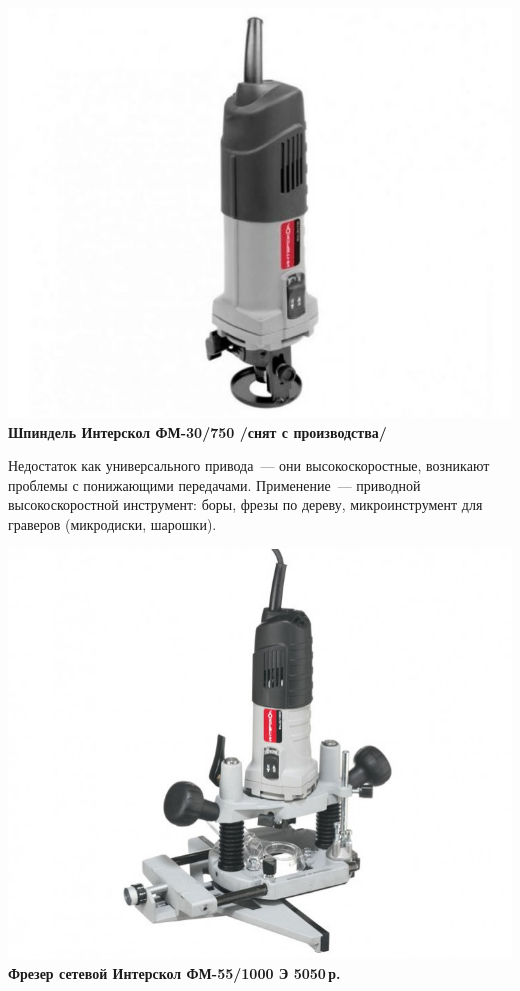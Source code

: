 \documentclass{magazine}
\begin{document}
{\noindent\includegraphics[width=\columnwidth]{fig/00/Interskol30.jpg}
\textbf{Шпиндель Интерскол ФМ-30/750 /снят с производства/}

Недостаток как универсального привода\ --- они высокоскоростные,
возникают проблемы с понижающими передачами. Применение\ --- приводной
высокоскоростной инструмент: боры, фрезы по дереву, микроинструмент для
граверов (микродиски, шарошки).

\noindent\href{http://www.kuvalda.ru/catalog/1867/27920/}{
\includegraphics[width=\columnwidth]{fig/00/InterskolFM55.jpg}}
\textbf{Фрезер сетевой Интерскол ФМ-55/1000 Э 5050\,р.}

}
\end{document}
